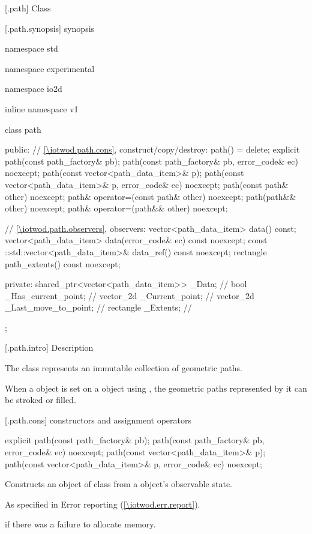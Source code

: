  [\iotwod.path] {Class }

 [\iotwod.path.synopsis] { synopsis}

\begin{codeblock}
namespace std { namespace experimental { namespace io2d { inline namespace v1 {
  class path {
    public:
    // \ref{\iotwod.path.cons}, construct/copy/destroy:
    path() = delete;
    explicit path(const path_factory& pb);
    path(const path_factory& pb, error_code& ec) noexcept;
    path(const vector<path_data_item>& p);
    path(const vector<path_data_item>& p, error_code& ec) noexcept;
    path(const path& other) noexcept;
    path& operator=(const path& other) noexcept;
    path(path&& other) noexcept;
    path& operator=(path&& other) noexcept;

    // \ref{\iotwod.path.observers}, observers:
    vector<path_data_item> data() const;
    vector<path_data_item> data(error_code& ec) const noexcept;
    const ::std::vector<path_data_item>& data_ref() const noexcept;
    rectangle path_extents() const noexcept;
    
  private:
    shared_ptr<vector<path_data_item>> _Data; // \expos
    bool _Has_current_point;                  // \expos
    vector_2d _Current_point;                 // \expos
    vector_2d _Last_move_to_point;            // \expos
    rectangle _Extents;                       // \expos
  };
} } } }
\end{codeblock}

 [\iotwod.path.intro] { Description}

\pnum
{}
The  class represents an immutable collection of geometric paths.

\pnum
When a  object is set on a  object using 
, the geometric paths represented by it can be 
stroked or filled.

 [\iotwod.path.cons] { constructors and assignment operators}

\begin{itemdecl}
    explicit path(const path_factory& pb);
    path(const path_factory& pb, error_code& ec) noexcept;
    path(const vector<path_data_item>& p);
    path(const vector<path_data_item>& p, error_code& ec) noexcept;
\end{itemdecl}
\begin{itemdescr}
	\pnum
	\effects
	Constructs an object of class  from a  
	object's observable state.

	\pnum
	\throws
	As specified in Error reporting (\ref{\iotwod.err.report}).

	\pnum
	\errors
	 if there was a failure to allocate memory.
	
	\pnum
\end{itemdescr}

